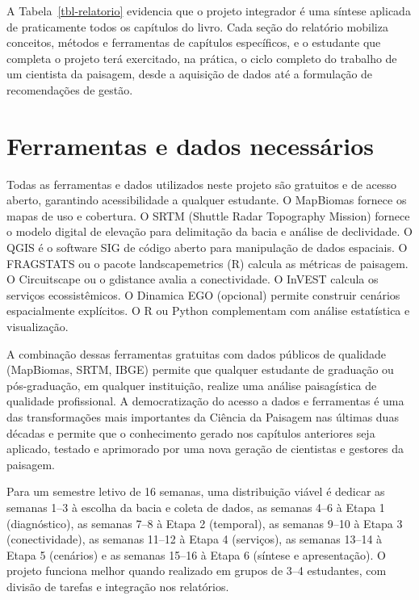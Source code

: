 \documentclass[
  portuguese,
  11pt,
  a4paper,
  open=any]{scrbook}
\begin{document}
A Tabela~\ref{tbl-relatorio} evidencia que o projeto integrador é uma
síntese aplicada de praticamente todos os capítulos do livro. Cada seção
do relatório mobiliza conceitos, métodos e ferramentas de capítulos
específicos, e o estudante que completa o projeto terá exercitado, na
prática, o ciclo completo do trabalho de um cientista da paisagem, desde
a aquisição de dados até a formulação de recomendações de gestão.

\section{Ferramentas e dados
necessários}\label{ferramentas-e-dados-necessuxe1rios}

Todas as ferramentas e dados utilizados neste projeto são gratuitos e de
acesso aberto, garantindo acessibilidade a qualquer estudante. O
MapBiomas fornece os mapas de uso e cobertura. O SRTM (Shuttle Radar
Topography Mission) fornece o modelo digital de elevação para
delimitação da bacia e análise de declividade. O QGIS é o software SIG
de código aberto para manipulação de dados espaciais. O FRAGSTATS ou o
pacote landscapemetrics (R) calcula as métricas de paisagem. O
Circuitscape ou o gdistance avalia a conectividade. O InVEST calcula os
serviços ecossistêmicos. O Dinamica EGO (opcional) permite construir
cenários espacialmente explícitos. O R ou Python complementam com
análise estatística e visualização.

A combinação dessas ferramentas gratuitas com dados públicos de
qualidade (MapBiomas, SRTM, IBGE) permite que qualquer estudante de
graduação ou pós-graduação, em qualquer instituição, realize uma análise
paisagística de qualidade profissional. A democratização do acesso a
dados e ferramentas é uma das transformações mais importantes da Ciência
da Paisagem nas últimas duas décadas e permite que o conhecimento gerado
nos capítulos anteriores seja aplicado, testado e aprimorado por uma
nova geração de cientistas e gestores da paisagem.

\begin{tcolorbox}[enhanced jigsaw, colbacktitle=quarto-callout-tip-color!10!white, coltitle=black, opacityback=0, breakable, left=2mm, colback=white, bottomtitle=1mm, toptitle=1mm, titlerule=0mm, arc=.35mm, opacitybacktitle=0.6, leftrule=.75mm, colframe=quarto-callout-tip-color-frame, title=\textcolor{quarto-callout-tip-color}{\faLightbulb}\hspace{0.5em}{Sugestão de cronograma}, rightrule=.15mm, bottomrule=.15mm, toprule=.15mm]

Para um semestre letivo de 16 semanas, uma distribuição viável é dedicar
as semanas 1--3 à escolha da bacia e coleta de dados, as semanas 4--6 à
Etapa 1 (diagnóstico), as semanas 7--8 à Etapa 2 (temporal), as semanas
9--10 à Etapa 3 (conectividade), as semanas 11--12 à Etapa 4 (serviços),
as semanas 13--14 à Etapa 5 (cenários) e as semanas 15--16 à Etapa 6
(síntese e apresentação). O projeto funciona melhor quando realizado em
grupos de 3--4 estudantes, com divisão de tarefas e integração nos
relatórios.

\end{tcolorbox}
\end{document}
